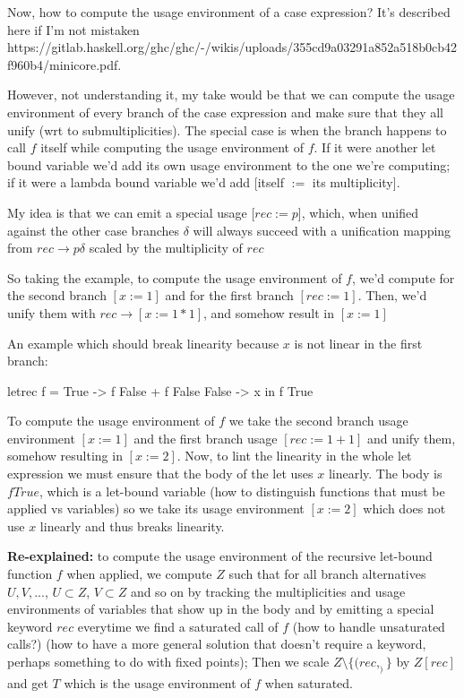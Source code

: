 \documentclass[a4paper, draft]{article}
\begin{document}
Now, how to compute the usage environment of a case expression? It's described
here if I'm not mistaken
https://gitlab.haskell.org/ghc/ghc/-/wikis/uploads/355cd9a03291a852a518b0cb42f960b4/minicore.pdf.

However, not understanding it, my take would be that we can compute the usage
environment of every branch of the case expression and make sure that they all
unify (wrt to submultiplicities). The special case is when the branch happens to
call $f$ itself while computing the usage environment of $f$. If it were another
let bound variable we'd add its own usage environment to the one we're
computing; if it were a lambda bound variable we'd add [itself $:=$ its
multiplicity].

My idea is that we can emit a special usage [$rec := p$], which, when unified
against the other case branches $\delta$ will always succeed with a unification
mapping from $rec \rightarrow p\delta$ scaled by the multiplicity of $rec$

So taking the example, to compute the usage environment of $f$, we'd compute for
the second branch $[x := 1]$ and for the first branch $[rec := 1]$. Then, we'd
unify them with $rec \rightarrow [x := 1*1]$, and somehow result in $[x := 1]$

An example which should break linearity because $x$ is not linear in the first
branch:
\begin{code}
letrec f = \case
         True -> f False + f False
         False -> x
    in f True
\end{code}

To compute the usage environment of $f$ we take the second branch usage
environment $[x := 1]$ and the first branch usage $[rec := 1+1]$ and unify them,
somehow resulting in $[x := 2]$. Now, to lint the linearity in the whole let
expression we must ensure that the body of the let uses $x$ linearly. The body
is $f True$, which is a let-bound variable (how to distinguish functions that
must be applied vs variables) so we take its usage environment $[x := 2]$ which
does not use $x$ linearly and thus breaks linearity.

\textbf{Re-explained:} to compute the usage environment of the recursive
let-bound function $f$ when applied, we compute $Z$ such that for all branch
alternatives $U,V,...$, $U \subset Z$, $V \subset Z$ and so on by tracking the
multiplicities and usage environments of variables that show up in the body and
by emitting a special keyword $rec$ everytime we find a saturated call of $f$
(how to handle unsaturated calls?) (how to have a more general solution that
doesn't require a keyword, perhaps something to do with fixed points); Then we
scale $Z \setminus \{(rec,_)\}$ by $Z[rec]$ and get $T$ which is the usage
environment of $f$ when saturated.
\end{document}
